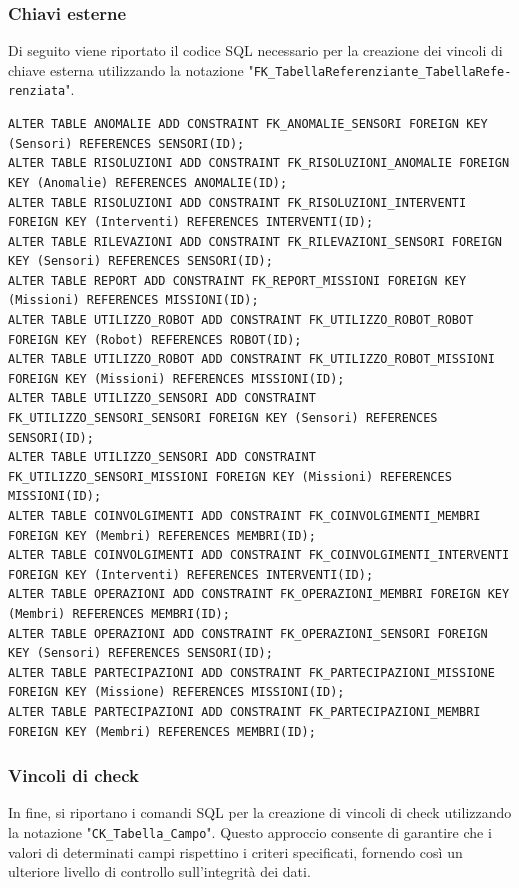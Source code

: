 \subsubsection{Chiavi esterne}
Di seguito viene riportato il codice SQL necessario  per la creazione dei vincoli di chiave esterna utilizzando la notazione "\texttt{FK\_TabellaReferenziante\_TabellaRefe-\\renziata}".
\begin{lstlisting}
ALTER TABLE ANOMALIE ADD CONSTRAINT FK_ANOMALIE_SENSORI FOREIGN KEY (Sensori) REFERENCES SENSORI(ID);
ALTER TABLE RISOLUZIONI ADD CONSTRAINT FK_RISOLUZIONI_ANOMALIE FOREIGN KEY (Anomalie) REFERENCES ANOMALIE(ID);
ALTER TABLE RISOLUZIONI ADD CONSTRAINT FK_RISOLUZIONI_INTERVENTI FOREIGN KEY (Interventi) REFERENCES INTERVENTI(ID);
ALTER TABLE RILEVAZIONI ADD CONSTRAINT FK_RILEVAZIONI_SENSORI FOREIGN KEY (Sensori) REFERENCES SENSORI(ID);
ALTER TABLE REPORT ADD CONSTRAINT FK_REPORT_MISSIONI FOREIGN KEY (Missioni) REFERENCES MISSIONI(ID);
ALTER TABLE UTILIZZO_ROBOT ADD CONSTRAINT FK_UTILIZZO_ROBOT_ROBOT FOREIGN KEY (Robot) REFERENCES ROBOT(ID);
ALTER TABLE UTILIZZO_ROBOT ADD CONSTRAINT FK_UTILIZZO_ROBOT_MISSIONI FOREIGN KEY (Missioni) REFERENCES MISSIONI(ID);
ALTER TABLE UTILIZZO_SENSORI ADD CONSTRAINT FK_UTILIZZO_SENSORI_SENSORI FOREIGN KEY (Sensori) REFERENCES SENSORI(ID);
ALTER TABLE UTILIZZO_SENSORI ADD CONSTRAINT FK_UTILIZZO_SENSORI_MISSIONI FOREIGN KEY (Missioni) REFERENCES MISSIONI(ID);
ALTER TABLE COINVOLGIMENTI ADD CONSTRAINT FK_COINVOLGIMENTI_MEMBRI FOREIGN KEY (Membri) REFERENCES MEMBRI(ID);
ALTER TABLE COINVOLGIMENTI ADD CONSTRAINT FK_COINVOLGIMENTI_INTERVENTI FOREIGN KEY (Interventi) REFERENCES INTERVENTI(ID);
ALTER TABLE OPERAZIONI ADD CONSTRAINT FK_OPERAZIONI_MEMBRI FOREIGN KEY (Membri) REFERENCES MEMBRI(ID);
ALTER TABLE OPERAZIONI ADD CONSTRAINT FK_OPERAZIONI_SENSORI FOREIGN KEY (Sensori) REFERENCES SENSORI(ID);
ALTER TABLE PARTECIPAZIONI ADD CONSTRAINT FK_PARTECIPAZIONI_MISSIONE FOREIGN KEY (Missione) REFERENCES MISSIONI(ID);
ALTER TABLE PARTECIPAZIONI ADD CONSTRAINT FK_PARTECIPAZIONI_MEMBRI FOREIGN KEY (Membri) REFERENCES MEMBRI(ID);
\end{lstlisting}

\subsubsection{Vincoli di check}
In fine, si riportano i comandi SQL per la creazione di vincoli di check utilizzando la notazione "\texttt{CK\_Tabella\_Campo}". Questo approccio consente di garantire che i valori di determinati campi rispettino i criteri specificati, fornendo così un ulteriore livello di controllo sull'integrità dei dati.

